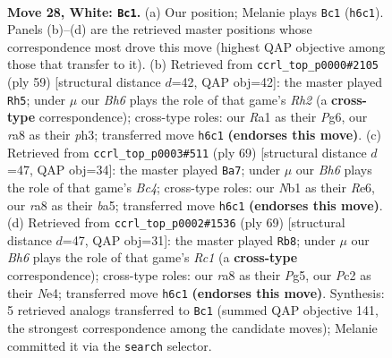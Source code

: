 \documentclass[11pt]{article}
\begin{document}
\clearpage

\begin{figure}[p]\centering
\begin{subfigure}{0.46\textwidth}\centering
\resizebox{\linewidth}{!}{%
\newchessgame
\chessboard[
  setfen={rn6/5k2/5b1B/2p5/p3p2p/P7/1PP2PPP/RN2K3 w - - 0 28},
  showmover=false,
  pgfstyle=straightmove, color=movearrow, markmove={h6-c1}
]}
\caption{}
\end{subfigure}\hfill
\begin{subfigure}{0.46\textwidth}\centering
\resizebox{\linewidth}{!}{%
\newchessgame
\chessboard[
  setfen={8/1p1k3r/pp4p1/3p4/PPn4p/2P4P/5PP1/2BR2K1 b - - 3 30},
  showmover=false,
  pgfstyle=straightmove, color=movearrow, markmove={h7-h5}
]}
\caption{}
\end{subfigure}
\\[4pt]
\begin{subfigure}{0.46\textwidth}\centering
\resizebox{\linewidth}{!}{%
\newchessgame
\chessboard[
  setfen={8/5k2/2p1r1p1/B1b1ppPp/P6P/5P2/1PK1R3/8 b - - 2 35},
  showmover=false,
  pgfstyle=straightmove, color=movearrow, markmove={c5-a7}
]}
\caption{}
\end{subfigure}\hfill
\begin{subfigure}{0.46\textwidth}\centering
\resizebox{\linewidth}{!}{%
\newchessgame
\chessboard[
  setfen={2r2k2/5p2/2p5/3p2p1/p2Pn1P1/P7/1P3P2/2RB1K2 b - - 3 35},
  showmover=false,
  pgfstyle=straightmove, color=movearrow, markmove={c8-b8}
]}
\caption{}
\end{subfigure}
\caption{\textbf{Move 28, White: \texttt{Bc1}.} (a) Our position; Melanie plays \texttt{Bc1} (\texttt{h6c1}). Panels (b)--(d) are the retrieved master positions whose correspondence most drove this move (highest QAP objective among those that transfer to it). (b) Retrieved from \texttt{ccrl\_top\_p0000\#2105} (ply 59) [structural distance $d$=42, QAP obj=42]: the master played \texttt{Rh5}; under $\mu$ our \emph{Bh6} plays the role of that game's \emph{Rh2} (a \textbf{cross-type} correspondence); cross-type roles: our \emph{R}a1 as their \emph{P}g6, our \emph{r}a8 as their \emph{p}h3; transferred move \texttt{h6c1} \textbf{(endorses this move)}. (c) Retrieved from \texttt{ccrl\_top\_p0003\#511} (ply 69) [structural distance $d$=47, QAP obj=34]: the master played \texttt{Ba7}; under $\mu$ our \emph{Bh6} plays the role of that game's \emph{Bc4}; cross-type roles: our \emph{N}b1 as their \emph{R}e6, our \emph{r}a8 as their \emph{b}a5; transferred move \texttt{h6c1} \textbf{(endorses this move)}. (d) Retrieved from \texttt{ccrl\_top\_p0002\#1536} (ply 69) [structural distance $d$=47, QAP obj=31]: the master played \texttt{Rb8}; under $\mu$ our \emph{Bh6} plays the role of that game's \emph{Rc1} (a \textbf{cross-type} correspondence); cross-type roles: our \emph{r}a8 as their \emph{P}g5, our \emph{P}c2 as their \emph{N}e4; transferred move \texttt{h6c1} \textbf{(endorses this move)}. Synthesis: 5 retrieved analogs transferred to \texttt{Bc1} (summed QAP objective 141, the strongest correspondence among the candidate moves); Melanie committed it via the \texttt{search} selector.}
\label{fig:thought-m54}
\end{figure}
\end{document}
